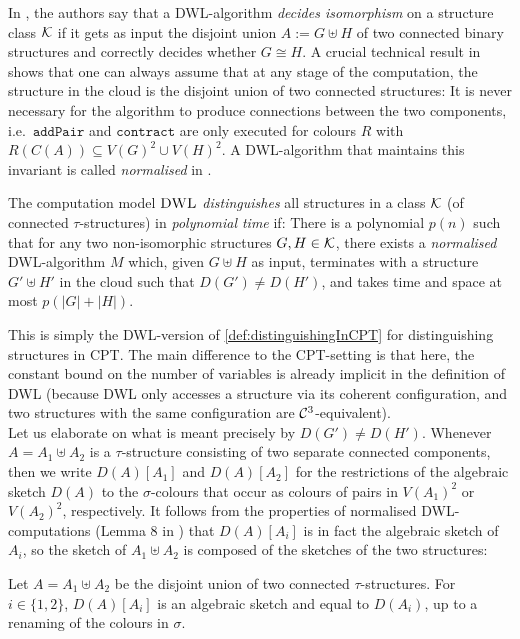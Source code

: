 \documentclass[a4paper,UKenglish,cleveref, autoref, thm-restate]{lipics-v2021}
\newcommand{\DWL}{\mbox{\sc DWL}}
\newcommand{\Cc}{{\cal C}}
\newcommand{\Kk}{{\cal K}}
\newcommand{\pairOp }{\texttt{addPair}}
\newcommand{\sccOp }{\texttt{contract}}
\begin{document}
	In \cite{dwl}, the authors say that a DWL-algorithm \emph{decides isomorphism} on a structure class $\Kk$ if it gets as input the disjoint union $A:= G \uplus H$ of two connected binary structures and correctly decides whether $G \cong H$. A crucial technical result in \cite{dwl} shows that one can always assume that at any stage of the computation, the structure in the cloud is the disjoint union of two connected structures: It is never necessary for the algorithm to produce connections between the two components, i.e.\ $\pairOp$ and $\sccOp$ are only executed for colours $R$ with $R(C(A)) \subseteq V(G)^2 \cup V(H)^2$. A DWL-algorithm that maintains this invariant is called \emph{normalised} in \cite{dwl}. 
	\begin{definition}
		\label{def:PC_distinguishInDWL}
		The computation model $\DWL$ \emph{distinguishes} all structures in a class $\Kk$ (of connected $\tau$-structures) in \emph{polynomial time} if: There is a polynomial $p(n)$ such that for any two non-isomorphic structures $G, H \in \Kk$, there exists a \emph{normalised} DWL-algorithm $M$ which, given $G\uplus H$ as input, terminates with a structure $G' \uplus H'$ in the cloud such that $D(G') \neq D(H')$, and takes time and space at most $p(|G|+|H|)$.	
	\end{definition}	
	This is simply the DWL-version of \autoref{def:distinguishingInCPT} for distinguishing structures in CPT. The main difference to the CPT-setting is that here, the constant bound on the number of variables is already implicit in the definition of DWL (because DWL only accesses a structure via its coherent configuration, and two structures with the same configuration are $\Cc^3$-equivalent).\\
	Let us elaborate on what is meant precisely by $D(G') \neq D(H')$.
	Whenever $A = A_1 \uplus A_2$ is a $\tau$-structure consisting of two separate connected components, then we write $D(A)[A_1]$ and $D(A)[A_2]$ for the restrictions of the algebraic sketch $D(A)$ to the $\sigma$-colours that occur as colours of pairs in $V(A_1)^2$ or $V(A_2)^2$, respectively. 
	It follows from the properties of normalised DWL-computations (Lemma 8 in \cite{dwl}) that $D(A)[A_i]$ is in fact the algebraic sketch of $A_i$, so the sketch of $A_1 \uplus A_2$ is composed of the sketches of the two structures:
	\begin{lemma}
		\label{lem:restrictionOfSketch}
		Let $A = A_1 \uplus A_2$ be the disjoint union of two connected $\tau$-structures. For $i \in \{1,2\}$, $D(A)[A_i]$ is an algebraic sketch and equal to $D(A_i)$, up to a renaming of the colours in $\sigma$.
	\end{lemma}  
\end{document}
